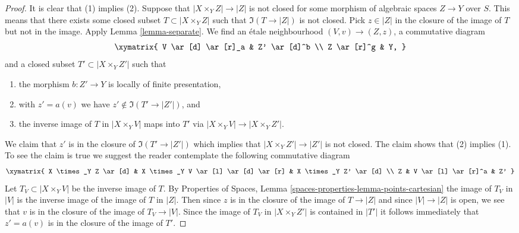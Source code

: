 \begin{proof}
It is clear that (1) implies (2).
Suppose that $|X \times_Y Z| \to |Z|$ is not closed for some
morphism of algebraic spaces $Z \to Y$ over $S$. This means that there
exists some closed subset $T \subset |X \times_Y Z|$
such that $\Im(T \to |Z|)$ is not closed. Pick $z \in |Z|$
in the closure of the image of $T$ but not in the image.
Apply Lemma \ref{lemma-separate}.
We find an \'etale neighbourhood $(V, v) \to (Z, z)$, a commutative diagram
$$
\xymatrix{
V \ar[d] \ar[r]_a & Z' \ar[d]^b \\
Z \ar[r]^g & Y,
}
$$
and a closed subset $T' \subset |X \times_Y Z'|$ such that
\begin{enumerate}
\item the morphism $b : Z' \to Y$ is locally of finite presentation,
\item with $z' = a(v)$ we have $z' \not \in \Im(T' \to |Z'|)$, and
\item the inverse image of $T$ in $|X \times_Y V|$ maps into $T'$ via
$|X \times_Y V| \to |X \times_Y Z'|$.
\end{enumerate}
We claim that $z'$ is in the closure of $\Im(T' \to |Z'|)$
which implies that $|X \times_Y Z'| \to |Z'|$ is not closed.
The claim shows that (2) implies (1).
To see the claim is true we suggest the reader contemplate the
following commutative diagram
$$
\xymatrix{
X \times_Y Z \ar[d] &
X \times_Y V \ar[l] \ar[d] \ar[r] &
X \times_Y Z' \ar[d] \\
Z & V \ar[l] \ar[r]^a & Z'
}
$$
Let $T_V \subset |X \times_Y V|$ be the inverse image of $T$.
By Properties of Spaces, Lemma \ref{spaces-properties-lemma-points-cartesian}
the image of $T_V$ in $|V|$ is the inverse image of the image
of $T$ in $|Z|$. Then since $z$ is in the closure of the image of
$T \to |Z|$ and since $|V| \to |Z|$ is open, we see that $v$ is in
the closure of the image of $T_V \to |V|$. Since the image of
$T_V$ in $|X \times_Y Z'|$ is contained in $|T'|$ it follows
immediately that $z' = a(v)$ is in the closure of the image of $T'$.


\end{proof}
